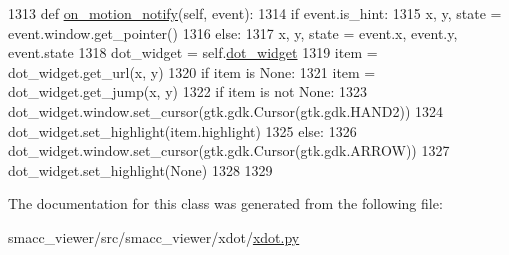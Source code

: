 \begin{DoxyCode}
1313     \textcolor{keyword}{def }\hyperlink{classsmacc__viewer_1_1xdot_1_1xdot_1_1NullAction_ae77c1e1dd5fdd7f6bc71715a2c277f00}{on\_motion\_notify}(self, event):
1314         \textcolor{keywordflow}{if} event.is\_hint:
1315             x, y, state = event.window.get\_pointer()
1316         \textcolor{keywordflow}{else}:
1317             x, y, state = event.x, event.y, event.state
1318         dot\_widget = self.\hyperlink{classsmacc__viewer_1_1xdot_1_1xdot_1_1DragAction_afbd8271575b937b6d47a89a7de5fc186}{dot\_widget}
1319         item = dot\_widget.get\_url(x, y)
1320         \textcolor{keywordflow}{if} item \textcolor{keywordflow}{is} \textcolor{keywordtype}{None}:
1321             item = dot\_widget.get\_jump(x, y)
1322         \textcolor{keywordflow}{if} item \textcolor{keywordflow}{is} \textcolor{keywordflow}{not} \textcolor{keywordtype}{None}:
1323             dot\_widget.window.set\_cursor(gtk.gdk.Cursor(gtk.gdk.HAND2))
1324             dot\_widget.set\_highlight(item.highlight)
1325         \textcolor{keywordflow}{else}:
1326             dot\_widget.window.set\_cursor(gtk.gdk.Cursor(gtk.gdk.ARROW))
1327             dot\_widget.set\_highlight(\textcolor{keywordtype}{None})
1328 
1329 
\end{DoxyCode}


The documentation for this class was generated from the following file\+:\begin{DoxyCompactItemize}
\item 
smacc\+\_\+viewer/src/smacc\+\_\+viewer/xdot/\hyperlink{xdot_8py}{xdot.\+py}\end{DoxyCompactItemize}
